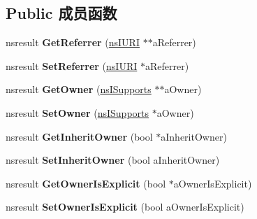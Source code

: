 \subsection*{Public 成员函数}
\begin{DoxyCompactItemize}
\item 
\mbox{\label{interfacens_i_doc_shell_load_info_a24d4973c91aeae4dd766e95ab1abb3c1}} 
nsresult {\bfseries Get\+Referrer} (\hyperlink{interfacens_i_u_r_i}{ns\+I\+U\+RI} $\ast$$\ast$a\+Referrer)
\item 
\mbox{\label{interfacens_i_doc_shell_load_info_aa76b92e365e3ab5c1c72eccc659f4caa}} 
nsresult {\bfseries Set\+Referrer} (\hyperlink{interfacens_i_u_r_i}{ns\+I\+U\+RI} $\ast$a\+Referrer)
\item 
\mbox{\label{interfacens_i_doc_shell_load_info_aaab9d81d6d9f5d3e75200b873bc9c55e}} 
nsresult {\bfseries Get\+Owner} (\hyperlink{interfacens_i_supports}{ns\+I\+Supports} $\ast$$\ast$a\+Owner)
\item 
\mbox{\label{interfacens_i_doc_shell_load_info_a9fbe06455aed69a3e49c40b86332f062}} 
nsresult {\bfseries Set\+Owner} (\hyperlink{interfacens_i_supports}{ns\+I\+Supports} $\ast$a\+Owner)
\item 
\mbox{\label{interfacens_i_doc_shell_load_info_ae971467599006e8ef2d4de7380411857}} 
nsresult {\bfseries Get\+Inherit\+Owner} (bool $\ast$a\+Inherit\+Owner)
\item 
\mbox{\label{interfacens_i_doc_shell_load_info_ab1aef1ff1d00dfee115b53e378aaa159}} 
nsresult {\bfseries Set\+Inherit\+Owner} (bool a\+Inherit\+Owner)
\item 
\mbox{\label{interfacens_i_doc_shell_load_info_a4bd2d81da3c3dd656959bc8d2d8b5b91}} 
nsresult {\bfseries Get\+Owner\+Is\+Explicit} (bool $\ast$a\+Owner\+Is\+Explicit)
\item 
\mbox{\label{interfacens_i_doc_shell_load_info_a7da43f75be42a80dc3710b800c262611}} 
nsresult {\bfseries Set\+Owner\+Is\+Explicit} (bool a\+Owner\+Is\+Explicit)

\end{DoxyCompactItemize}
